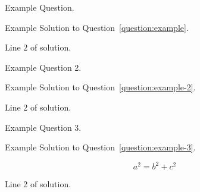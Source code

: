 \begin{question}{50}
  \label{question:example}
  Example Question.
\end{question}

\begin{solution}
  Example Solution to Question~\ref{question:example}.

  Line 2 of solution.

\end{solution}

\begin{question}{50}
  \label{question:example-2}
  Example Question 2.
\end{question}

\begin{solution}
  Example Solution to Question~\ref{question:example-2}.

  Line 2 of solution.
\end{solution}


\newpage


\begin{question}{50}
  \label{question:example-3}
  Example Question 3.
\end{question}

\begin{solution}
  Example Solution to Question~\ref{question:example-3}.

  \[ a^{2} = b^{2} + c^{2}\]

  Line 2 of solution.
\end{solution}

